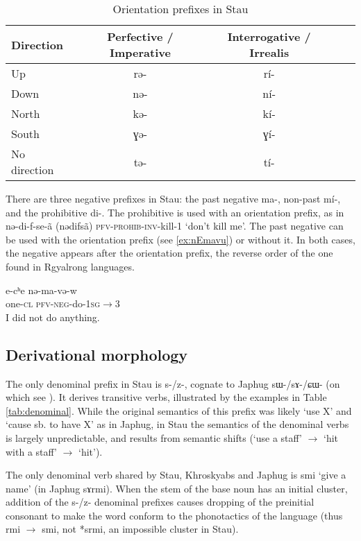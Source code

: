 \documentclass[oneside,a4paper,11pt]{article}
\newcommand{\ipa}[1]{{\phon#1}} %
\begin{document}
\begin{table}[h]
\caption{Orientation prefixes in Stau} 
\label{tab:dir.pref} \centering
\begin{tabular}{lcccc}
\toprule
Direction & Perfective / Imperative & Interrogative / Irrealis \\
\midrule
 Up & \ipa{rə-} & \ipa{rí-} \\
Down & \ipa{nə-} & \ipa{ní-} \\
North  & \ipa{kə-} & \ipa{kí-} \\
South & \ipa{ɣə-} & \ipa{ɣí-} \\
No direction & \ipa{tə-} & \ipa{tí-} \\
\bottomrule
\end{tabular}
\end{table}

There are three negative prefixes in Stau: the past negative \ipa{ma-}, non-past \ipa{mí-}, and the prohibitive \ipa{di-}. The prohibitive is used with an orientation prefix, as in \ipa{nə-di-f-se-ã}  (\ipa{nədifsã}) \textsc{pfv-prohib-inv}-kill-1 `don't kill me'. The past negative can be used with the orientation prefix (see \ref{ex:nEmavu}) or without it. In both cases, the negative appears after the orientation prefix, the reverse order of the one found in Rgyalrong languages.


\begin{exe}
\ex \label{ex:nEmavu} 
\gll
\ipa{e-cʰe} 	\ipa{nə-ma-və-w}  \\
one-\textsc{cl} \textsc{pfv-neg}-do-\textsc{1sg}$\rightarrow$3 \\
\glt I did not do anything.
\end{exe}


 \subsection{Derivational morphology}
 
The only denominal prefix in Stau is \ipa{s-/z-}, cognate to Japhug \ipa{sɯ-/sɤ-/ɕɯ-} (on which see \citealt[14-17]{jacques14antipassive}). It derives transitive verbs, illustrated by the examples in Table \ref{tab:denominal}. While the original semantics of this prefix was likely `use X' and `cause sb. to have X' as in Japhug, in Stau the semantics of the denominal verbs is largely unpredictable, and results from semantic shifts (`use a staff' $\rightarrow$ `hit with a staff' $\rightarrow$  `hit'). 

The only denominal verb shared by Stau, Khroskyabs and Japhug is \ipa{smi} `give a name' (in Japhug \ipa{sɤrmi}). When the stem of the base noun has an initial cluster, addition of the \ipa{s-/z-} denominal prefixes causes dropping of the preinitial consonant to make the word conform to the phonotactics of the language (thus \ipa{rmi} $\rightarrow$ \ipa{smi}, not *\ipa{srmi}, an impossible cluster in Stau). 
\end{document}
